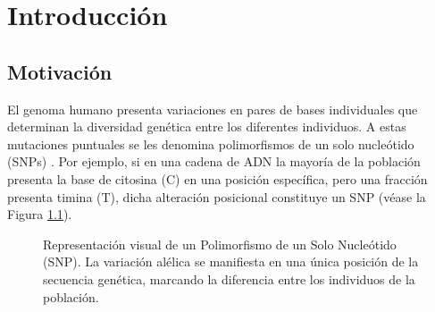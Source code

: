 \chapter{Introducción}

\section{Motivación}

El genoma humano presenta variaciones en pares de bases individuales que determinan la diversidad genética entre los diferentes individuos. A estas mutaciones puntuales se les denomina polimorfismos de un solo nucleótido (SNPs) \cite{hinds2005whole}. Por ejemplo, si en una cadena de ADN la mayoría de la población presenta la base de citosina (C) en una posición específica, pero una fracción presenta timina (T), dicha alteración posicional constituye un SNP (véase la Figura \ref{fig:ejemplo_snp}).

\begin{figure}[H]
    \centering
    \caption[Representación visual de un Polimorfismo de un Solo Nucleótido (SNP)]{Representación visual de un Polimorfismo de un Solo Nucleótido (SNP). La variación alélica se manifiesta en una única posición de la secuencia genética, marcando la diferencia entre los individuos de la población.}
    \label{fig:ejemplo_snp}
\end{figure}

